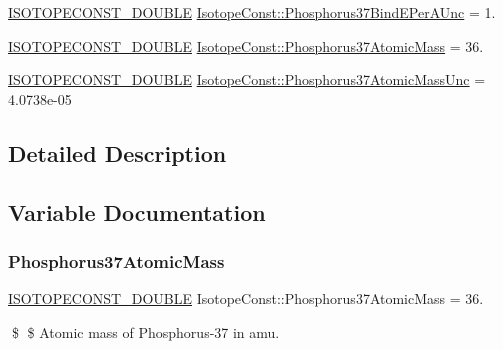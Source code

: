 \begin{DoxyCompactItemize}
\mbox{\hyperlink{group___isotope_const-_macros_ga8f45a7272ce02c0b4c65c44636ed719a}{I\+S\+O\+T\+O\+P\+E\+C\+O\+N\+S\+T\+\_\+\+D\+O\+U\+B\+LE}} \mbox{\hyperlink{group___isotope_const-_phosphorus-_p37_ga3184fef29483ebb01dd8ed857c83530b}{Isotope\+Const\+::\+Phosphorus37\+Bind\+E\+Per\+A\+Unc}} = 1.
\item 
\mbox{\hyperlink{group___isotope_const-_macros_ga8f45a7272ce02c0b4c65c44636ed719a}{I\+S\+O\+T\+O\+P\+E\+C\+O\+N\+S\+T\+\_\+\+D\+O\+U\+B\+LE}} \mbox{\hyperlink{group___isotope_const-_phosphorus-_p37_gaff1345f757fec4cceb191c996ae1daab}{Isotope\+Const\+::\+Phosphorus37\+Atomic\+Mass}} = 36.
\item 
\mbox{\hyperlink{group___isotope_const-_macros_ga8f45a7272ce02c0b4c65c44636ed719a}{I\+S\+O\+T\+O\+P\+E\+C\+O\+N\+S\+T\+\_\+\+D\+O\+U\+B\+LE}} \mbox{\hyperlink{group___isotope_const-_phosphorus-_p37_ga229a8d5e2de58645140270509ba83e8b}{Isotope\+Const\+::\+Phosphorus37\+Atomic\+Mass\+Unc}} = 4.\+0738e-\/05
\end{DoxyCompactItemize}


\subsection{Detailed Description}


\subsection{Variable Documentation}
\mbox{\label{group___isotope_const-_phosphorus-_p37_gaff1345f757fec4cceb191c996ae1daab}} 
\subsubsection{\texorpdfstring{Phosphorus37\+Atomic\+Mass}{Phosphorus37AtomicMass}}
{\footnotesize\ttfamily \mbox{\hyperlink{group___isotope_const-_macros_ga8f45a7272ce02c0b4c65c44636ed719a}{I\+S\+O\+T\+O\+P\+E\+C\+O\+N\+S\+T\+\_\+\+D\+O\+U\+B\+LE}} Isotope\+Const\+::\+Phosphorus37\+Atomic\+Mass = 36.}

\$ \$ Atomic mass of Phosphorus-\/37 in amu. \mbox{\label{group___isotope_const-_phosphorus-_p37_ga229a8d5e2de58645140270509ba83e8b}} 
